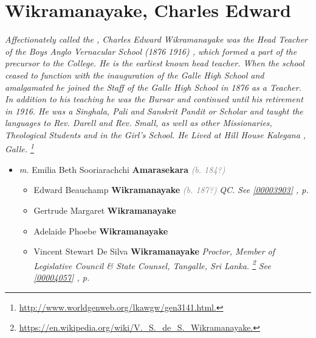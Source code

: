 \documentclass[10pt, openany]{book}
\begin{document}
\chapter{Wikramanayake, Charles Edward}
\label{00003901}
\textcolor{slmaroon}{\textit{Affectionately called the , Charles Edward Wikramanayake was the Head Teacher of the Boys Anglo Vernacular School (1876  1916) , which formed a part of the precursor to the College. He is the earliest known head teacher. When the school ceased to function with the inauguration of the Galle High School and amalgamated he joined the Staff of the Galle High School in 1876 as a Teacher. In addition to his teaching he was the Bursar and continued until his retirement in 1916. He was a Singhala, Pali and Sanskrit Pandit or Scholar and taught the languages to Rev. Darell and Rev. Small, as well as other Missionaries, Theological Students and in the Girl's School. He Lived at Hill House Kalegana , Galle.
\footnote{\url{http://www.worldgenweb.org/lkawgw/gen3141.html.}}}}
\begin{itemize}
\item{\textit{m.} Emilia Beth Sooriarachchi \textbf{Amarasekara} \textcolor{gray}{\textit{(b. 184?)}}   \label{couple:00003901:00003902} \begin{itemize}
\item{Edward Beauchamp \textbf{Wikramanayake} \textcolor{gray}{\textit{(b. 187?)}} \textcolor{slmaroon}{\textit{QC.}} \textcolor{slteal}{\textit{See  \autoref{00003903} \textit{, p. \pageref{00003903} }}}}
\item{Gertrude Margaret \textbf{Wikramanayake} \textcolor{slorange}{\textit{}}
  }
\item{Adelaide Phoebe \textbf{Wikramanayake} \textcolor{slorange}{\textit{}}
  }
\item{Vincent Stewart De Silva \textbf{Wikramanayake} \textcolor{slorange}{\textit{}} \textcolor{slmaroon}{\textit{Proctor, Member of Legislative Council \& State Counsel, Tangalle, Sri Lanka.
\footnote{\url{https://en.wikipedia.org/wiki/V._S._de_S._Wikramanayake.}}}} \textcolor{slteal}{\textit{See  \autoref{00004057} \textit{, p. \pageref{00004057} }}}}
\end{itemize}}
\end{itemize}
  
\end{document}
